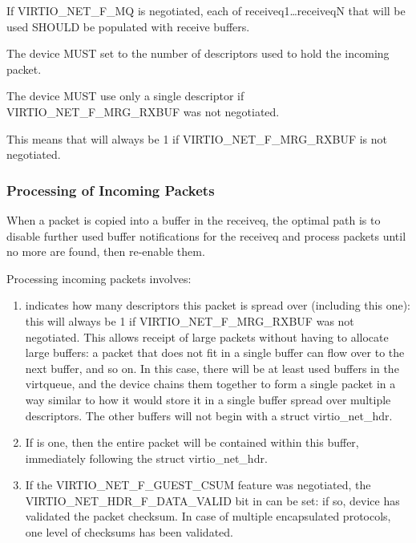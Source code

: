 If VIRTIO_NET_F_MQ is negotiated, each of receiveq1\ldots receiveqN
that will be used SHOULD be populated with receive buffers.


The device MUST set  to the number of descriptors used to
hold the incoming packet.

The device MUST use only a single descriptor if VIRTIO_NET_F_MRG_RXBUF
was not negotiated.
\begin{note}
{This means that  will always be 1
if VIRTIO_NET_F_MRG_RXBUF is not negotiated.}
\end{note}

\subsubsection{Processing of Incoming Packets}\label{sec:Device Types / Network Device / Device Operation / Processing of Incoming Packets}
\label{sec:Device Types / Network Device / Device Operation / Processing of Packets}%

When a packet is copied into a buffer in the receiveq, the
optimal path is to disable further used buffer notifications for the
receiveq and process packets until no more are found, then re-enable
them.

Processing incoming packets involves:

\begin{enumerate}
\item {} indicates how many descriptors
  this packet is spread over (including this one): this will
  always be 1 if VIRTIO_NET_F_MRG_RXBUF was not negotiated.
  This allows receipt of large packets without having to allocate large
  buffers: a packet that does not fit in a single buffer can flow
  over to the next buffer, and so on. In this case, there will be
  at least  used buffers in the virtqueue, and the device
  chains them together to form a single packet in a way similar to
  how it would store it in a single buffer spread over multiple
  descriptors.
  The other buffers will not begin with a struct virtio_net_hdr.

\item If
   is one, then the entire packet will be
  contained within this buffer, immediately following the struct
  virtio_net_hdr.
\item If the VIRTIO_NET_F_GUEST_CSUM feature was negotiated, the
  VIRTIO_NET_HDR_F_DATA_VALID bit in  can be
  set: if so, device has validated the packet checksum.
  In case of multiple encapsulated protocols, one level of checksums
  has been validated.
\end{enumerate}

